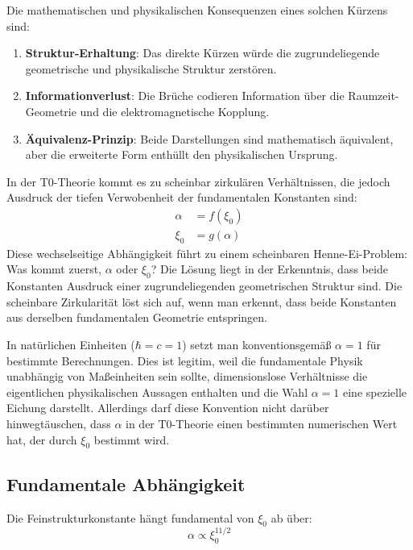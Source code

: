 \documentclass[12pt,a4paper]{article}
\newcommand{\xipar}{\xi_0}
\begin{document}
	Die mathematischen und physikalischen Konsequenzen eines solchen Kürzens sind:
	\begin{enumerate}
		\item \textbf{Struktur-Erhaltung}: Das direkte Kürzen würde die zugrundeliegende geometrische und physikalische Struktur zerstören.
		\item \textbf{Informationverlust}: Die Brüche codieren Information über die Raumzeit-Geometrie und die elektromagnetische Kopplung.
		\item \textbf{Äquivalenz-Prinzip}: Beide Darstellungen sind mathematisch äquivalent, aber die erweiterte Form enthüllt den physikalischen Ursprung.
	\end{enumerate}
	
	In der T0-Theorie kommt es zu scheinbar zirkulären Verhältnissen, die jedoch Ausdruck der tiefen Verwobenheit der fundamentalen Konstanten sind:
	\begin{align*}
		\alpha &= f(\xipar) \\
		\xipar &= g(\alpha)
	\end{align*}
	Diese wechselseitige Abhängigkeit führt zu einem scheinbaren Henne-Ei-Problem: Was kommt zuerst, $\alpha$ oder $\xipar$? Die Lösung liegt in der Erkenntnis, dass beide Konstanten Ausdruck einer zugrundeliegenden geometrischen Struktur sind. Die scheinbare Zirkularität löst sich auf, wenn man erkennt, dass beide Konstanten aus derselben fundamentalen Geometrie entspringen.
	
	In natürlichen Einheiten ($\hbar = c = 1$) setzt man konventionsgemäß $\alpha = 1$ für bestimmte Berechnungen. Dies ist legitim, weil die fundamentale Physik unabhängig von Maßeinheiten sein sollte, dimensionslose Verhältnisse die eigentlichen physikalischen Aussagen enthalten und die Wahl $\alpha = 1$ eine spezielle Eichung darstellt. Allerdings darf diese Konvention nicht darüber hinwegtäuschen, dass $\alpha$ in der T0-Theorie einen bestimmten numerischen Wert hat, der durch $\xipar$ bestimmt wird.
	
	\subsection{Fundamentale Abhängigkeit}
	
	Die Feinstrukturkonstante hängt fundamental von $\xipar$ ab über:
	\begin{equation}
		\alpha \propto \xipar^{11/2}
		\label{eq:alpha_xi_dependence}
	\end{equation}
	
\end{document}
